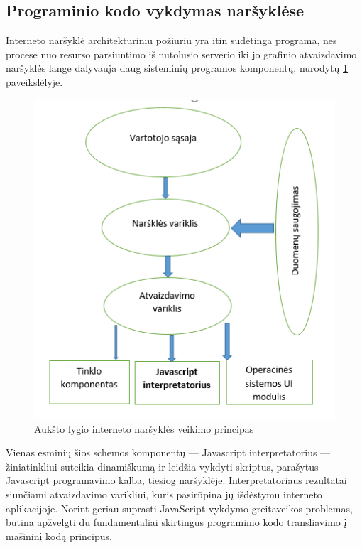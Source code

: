 \documentclass{VUMIFPSkursinis}
\begin{document}
\subsection{Programinio kodo vykdymas naršyklėse}
Interneto naršyklė architektūriniu požiūriu yra itin sudėtinga programa, nes procese nuo resurso parsiuntimo iš nutolusio serverio iki jo grafinio atvaizdavimo naršyklės lange dalyvauja daug sisteminių programos komponentų, nurodytų \ref{fig:browser_architecture} paveikslėlyje. 

\begin{figure}[h!]
  \begin{center}
  \includegraphics[scale=1]{naršyklės_architektūra.png}
  \end{center}
  \caption{Aukšto lygio interneto naršyklės veikimo principas}
  \label{fig:browser_architecture}
\end{figure}

Vienas esminių šios schemos komponentų — Javascript interpretatorius — žiniatinkliui suteikia dinamiškumą ir leidžia vykdyti skriptus, parašytus Javascript programavimo kalba, tiesiog naršyklėje. Interpretatoriaus rezultatai siunčiami atvaizdavimo varikliui, kuris pasirūpina jų išdėstymu interneto aplikacijoje. \cite{MOR17} Norint geriau suprasti JavaScript vykdymo greitaveikos problemas, būtina apžvelgti du fundamentaliai skirtingus programinio kodo transliavimo į mašininį kodą principus.
\end{document}
